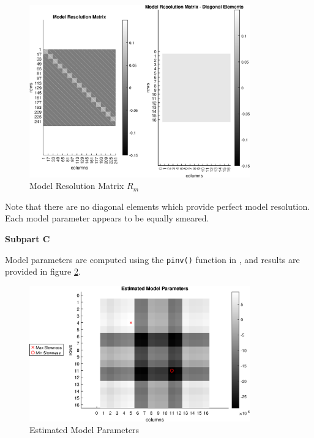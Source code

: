 \begin{figure}[h] 
	\centering
	\includegraphics[width=0.85\textwidth]{./images/prob2_partA_model_resolution_matrix.eps}
	\caption{Model Resolution Matrix $R_m$}
	\label{fig: prob2 part A model resolution matrix}
\end{figure}
\FloatBarrier

Note that there are no diagonal elements which provide perfect model resolution. Each model parameter appears to be equally smeared. \newline

\textbf{Subpart C} \newline

Model parameters are computed using the \verb|pinv()| function in \MATLAB, and results are provided in figure \ref{fig: prob2 part A estimated model parameters}.

\begin{figure}[h] 
	\centering
	\includegraphics[width=0.85\textwidth]{./images/prob2_partA_estimated_model_parameters.eps}
	\caption{Estimated Model Parameters}
	\label{fig: prob2 part A estimated model parameters}
\end{figure}
\FloatBarrier

